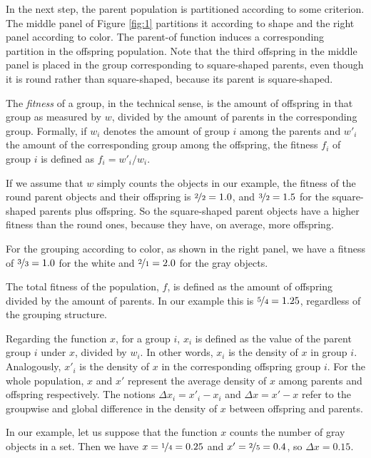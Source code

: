 \documentclass[output=paper,hidelinks]{langscibook}
\begin{document}
In the next step, the parent population is partitioned according to some criterion. The
middle panel of Figure \ref{fig:1} partitions it according to shape and the right panel
according to color. The parent-of function induces a corresponding partition in the
offspring population. Note that the third offspring in the middle panel is placed in the
group corresponding to square-shaped parents, even though it is round rather than
square-shaped, because its parent is square-shaped.

The \emph{fitness} of a group, in the technical sense, is the amount of offspring in that
group as measured by $w$, divided by the amount of parents in the corresponding
group. Formally, if $w_i$ denotes the amount of group $i$ among the parents and $w'_i$ the
amount of the corresponding group among the offspring, the fitness $f_i$ of group $i$ is
defined as $f_i = w'_i/w_i$.

If we assume that $w$ simply counts the objects in our example, the fitness of the round
parent objects and their offspring is $\nicefrac{2}{2} = 1.0$, and $\nicefrac{3}{2} = 1.5$
for the square-shaped parents plus offspring. So the square-shaped parent objects have a
higher fitness than the round ones, because they have, on average, more offspring.

For the grouping according to color, as shown in the right panel, we have a fitness of
$\nicefrac{3}{3}=1.0$ for the white and $\nicefrac{2}{1}=2.0$ for the gray objects.

The total fitness of the population, $f$, is defined as the amount of offspring divided
by the amount of parents. In our example this is $\nicefrac{5}{4}=1.25$, regardless of the
grouping structure.

Regarding the function $x$, for a group $i$, $x_i$ is defined as the value of the parent
group $i$ under $x$, divided by $w_i$. In other words, $x_i$ is the density of $x$ in
group $i$. Analogously, $x'_i$ is the density of $x$ in the corresponding offspring group
$i$. For the whole population, $x$ and $x'$ represent the average density of $x$ among
parents and offspring respectively. The notions $\Delta x_i = x'_i - x_i$ and $\Delta x =
x'-x$ refer to the groupwise and global difference in the density of $x$ between offspring
and parents.

In our example, let us suppose that the function $x$ counts the number of gray objects in
a set. Then we have $x=\nicefrac{1}{4}=0.25$ and $x'=\nicefrac{2}{5}=0.4$, so
$\Delta x = 0.15$.
\end{document}
